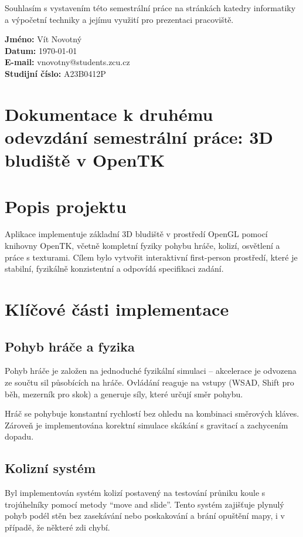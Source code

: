 \documentclass[12pt,a4paper]{article}
\begin{document}
\noindent
Souhlasím s vystavením této semestrální práce na stránkách katedry informatiky a výpočetní techniky a jejímu využití pro prezentaci pracoviště.

\vspace{1cm}

\begin{flushleft}
\textbf{Jméno:} Vít Novotný \\
\textbf{Datum:} \today \\
\textbf{E-mail:} vnovotny@students.zcu.cz \\
\textbf{Studijní číslo:} A23B0412P
\end{flushleft}

\vspace{0.5cm}

\section*{Dokumentace k druhému odevzdání semestrální práce: 3D bludiště v OpenTK}

\section{Popis projektu}
Aplikace implementuje základní 3D bludiště v prostředí OpenGL pomocí knihovny OpenTK, včetně kompletní fyziky pohybu hráče, kolizí, osvětlení a práce s texturami. Cílem bylo vytvořit interaktivní first-person prostředí, které je stabilní, fyzikálně konzistentní a odpovídá specifikaci zadání.

\section{Klíčové části implementace}

\subsection*{Pohyb hráče a fyzika}
Pohyb hráče je založen na jednoduché fyzikální simulaci – akcelerace je odvozena ze součtu sil působících na hráče. Ovládání reaguje na vstupy (WSAD, Shift pro běh, mezerník pro skok) a generuje síly, které určují směr pohybu.

Hráč se pohybuje konstantní rychlostí bez ohledu na kombinaci směrových kláves. Zároveň je implementována korektní simulace skákání s gravitací a zachycením dopadu.

\subsection*{Kolizní systém}
Byl implementován systém kolizí postavený na testování průniku koule s trojúhelníky pomocí metody ``move and slide''. Tento systém zajišťuje plynulý pohyb podél stěn bez zasekávání nebo poskakování a brání opuštění mapy, i v případě, že některé zdi chybí.
\end{document}

